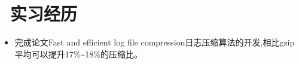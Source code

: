 \documentclass{resume}
\begin{document}




\vspace{-1ex}
\vspace{1.5ex}
\section{\faSitemap\ 实习经历}
\vspace{-0.5ex}
\begin{onehalfspacing}
\begin{itemize}
  \item 完成论文Fast and efficient log file compression日志压缩算法的开发,相比gzip平均可以提升17\%\textasciitilde18\%的压缩比。
\end{itemize}
\end{onehalfspacing}

\vspace{-1.5ex}

\end{document}
